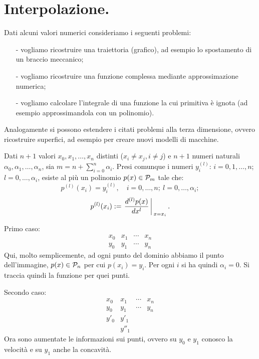 

\chapter{Interpolazione.}
\label{interpolazione}

Dati alcuni valori numerici consideriamo i seguenti problemi:
\begin{itemize}
\item[-]vogliamo ricostruire una traiettoria (grafico), ad esempio lo
spostamento di un braccio meccanico;
\item[-]vogliamo ricostruire una funzione complessa mediante approssimazione
numerica;
\item[-]vogliamo calcolare l'integrale di una funzione la cui primitiva è
ignota (ad esempio approssimandola con un polinomio).
\end{itemize}

Analogamente si possono estendere i citati problemi alla terza dimensione,
ovvero ricostruire superfici, ad esempio per creare nuovi modelli di macchine.

\begin{teo}\label{teo7.1}
Dati $n+1$ valori $x_0, x_1, \ldots, x_n$ distinti ($x_i \neq x_j, i\neq
j$) e $n+1$ numeri naturali $\alpha_0, \alpha_1, \ldots, \alpha_n$, sia
$m = n + \sum_{i = 0}^{n}\alpha_i$. Presi comunque i numeri $y_i^{(l)}$:
$i = 0, 1, \ldots, n$; $l = 0, \ldots, \alpha_i$, esiste al più un polinomio
$p(x) \in \mathcal{P}_m$ tale che:
\[
p^{(l)}(x_i) = y_i^{(l)}, \quad i = 0, \ldots, n; \ l = 0, \ldots, \alpha_i;
\]
\[p^{(l)}(x_i) := \left.\frac{d^{(l)}p(x)}{dx^{l}}\right\arrowvert_{x = x_i}.\]
\end{teo}

\begin{exe}
Primo caso:
\[\begin{array}{cccc}
x_0 & x_1 & \cdots & x_n \\
y_0 & y_1 & \cdots & y_n
\end{array}\]
Qui, molto semplicemente, ad ogni punto del dominio abbiamo il punto
dell'immagine, $p(x) \in \mathcal{P}_n$ per cui $p(x_i) = y_i$.
Per ogni $i$ si ha quindi $\alpha_i = 0$.
Si traccia quindi la funzione per quei punti.
\end{exe}
\begin{exe}
Secondo caso:
\[\begin{array}{cccc}
x_0  & x_1  & \cdots & x_n \\
y_0  & y_1  & \cdots & y_n \\
y'_0 & y'_1 &        &     \\
     & y''_1&       &
\end{array}\]
Ora sono aumentate le informazioni sui punti, ovvero su $y_0$ e $y_1$ conosco
la velocità e su $y_1$ anche la concavità.
\end{exe}

